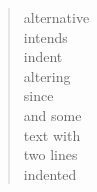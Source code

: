 \begin{verse}
alternative \\
\vin intends \\
indent \\
\vin altering \\
since \\

and some \\
\vin text with \\
\vin two lines \\
indented \\
\end{verse}
